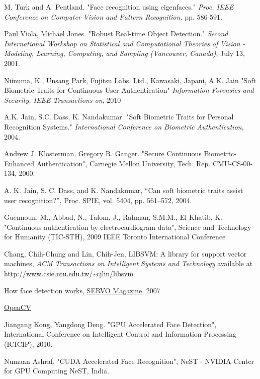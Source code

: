 \begin{thebibliography}{77}
 M. Turk and A. Pentland.
"Face recognition using eigenfaces."
\emph{Proc. IEEE Conference on Computer Vision and Pattern Recognition.} pp. 586-591.

Paul Viola, Michael Jones.
"Robust Real-time Object Detection."
\emph{Second International Workshop on Statistical and Computational Theories of Vision - Modeling, Learning, Computing, and Sampling (Vancouver, Canada)}, July 13, 2001.

 Niinuma, K., Unsang Park, Fujitsu Labs. Ltd., Kawasaki, Japani, A.K. Jain
"Soft Biometric Traits for Continuous User Authentication" 
\emph{Information Forensics and Security, IEEE Transactions on}, 2010

A.K. Jain, S.C. Dass, K. Nandakumar.
"Soft Biometric Traits for Personal Recognition Systems."
\emph{International Conference on Biometric Authentication}, 2004.

Andrew J. Klosterman, Gregory R. Ganger.
"Secure Continuous Biometric-Enhanced Authentication", 
Carnegie Mellon University, Tech. Rep. CMU-CS-00-134, 2000.

A. K. Jain, S. C. Dass, and K. Nandakumar,
“Can soft biometric traits assist user recognition?”,
Proc. SPIE, vol. 5404, pp. 561–572, 2004.

 Guennoun, M., Abbad, N., Talom, J., Rahman, S.M.M., El-Khatib, K. 
"Continuous authentication by electrocardiogram data",
Science and Technology for Humanity (TIC-STH), 2009 IEEE Toronto International Conference

Chang, Chih-Chung and Lin, Chih-Jen,
LIBSVM: A library for support vector machines,
\emph{ACM Transactions on Intelligent Systems and Technology}
available at \url{http://www.csie.ntu.edu.tw/~cjlin/libsvm}

How face detection works,
\href{http://www.servomagazine.com/}{SERVO Magazine}, 2007

\href{http://www.opencv.willowgarage.com/}{OpenCV}

\href{http://www.pages.drexel.edu/~sis26/Eigenface\%20Tutorial.htm}

 Jiangang Kong, Yangdong Deng. 
"GPU Accelerated Face Detection",
International Conference on Intelligent Control and Information Processing (ICICIP), 2010.

 Numaan Ashraf. 
"CUDA Accelerated Face Recognition",
NeST - NVIDIA Center for GPU Computing NeST, India.


\end{thebibliography}
